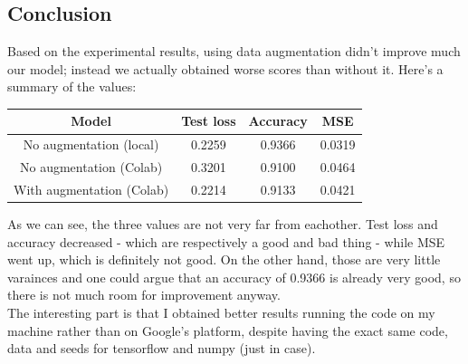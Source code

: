 \documentclass[11pt]{scrartcl}
\begin{document}
	\newpage
	\subsection*{Conclusion}

		Based on the experimental results, using data augmentation didn't improve much our model; instead we actually obtained worse scores than without it. Here's a summary of the values:

		\begin{table}[H]
			\centering
			\begin{tabular}{cccc}
				Model & Test loss & Accuracy & MSE\\
				\hline
				No augmentation (local) & 0.2259 & 0.9366 & 0.0319\\
				No augmentation (Colab) & 0.3201 & 0.9100 & 0.0464\\
				With augmentation (Colab) & 0.2214 & 0.9133 & 0.0421
			\end{tabular}
		\end{table}

		As we can see, the three values are not very far from eachother. Test loss and accuracy decreased - which are respectively a good and bad thing - while MSE went up, which is definitely not good. On the other hand, those are very little varainces and one could argue that an accuracy of 0.9366 is already very good, so there is not much room for improvement anyway.\\

		The interesting part is that I obtained better results running the code on my machine rather than on Google's platform, despite having the exact same code, data and seeds for tensorflow and numpy (just in case).
\end{document}
